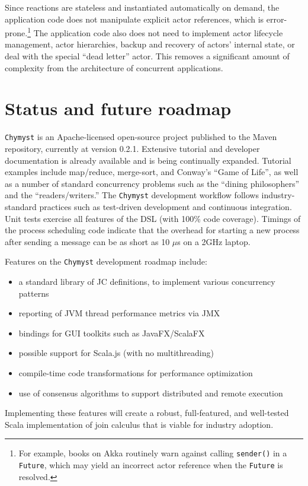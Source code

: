 \documentclass[sigplan,10pt,review,anonymous]{acmart}\settopmatter{printfolios=true}
\begin{document}
Since reactions are stateless and instantiated automatically
on demand, the application code does not manipulate explicit actor
references, which is error-prone.\footnote{ For example, books on Akka routinely warn against calling \texttt{sender()}
in a \texttt{Future}, which may yield an incorrect actor reference
when the \texttt{Future} is resolved.} The application code also does not need to implement actor lifecycle
management, actor hierarchies, backup and recovery of actors' internal
state, or deal with the special ``dead letter'' actor. This removes
a significant amount of complexity from the architecture of concurrent
applications.

\section{Status and future roadmap}

\texttt{Chymyst} is an Apache-licensed open-source project published
to the Maven repository, currently at version 0.2.1. Extensive tutorial
and developer documentation is already available and is being continually
expanded. Tutorial examples include map/reduce, merge-sort, and Conway's
``Game of Life'', as well as a number of standard concurrency problems
such as the ``dining philosophers'' and the ``readers/writers.''
The \texttt{Chymyst} development workflow follows industry-standard
practices such as test-driven development and continuous integration.
Unit tests exercise all features of the DSL (with 100\% code coverage).
Timings of the process scheduling code indicate that the overhead
for starting a new process after sending a message can be as short
as 10 $\mu$s on a 2GHz laptop. 

Features on the \texttt{Chymyst} development roadmap include:
\begin{itemize}
\item a standard library of JC definitions, to implement various concurrency
patterns
\item reporting of JVM thread performance metrics via JMX
\item bindings for GUI toolkits such as JavaFX/ScalaFX
\item possible support for Scala.js (with no multithreading)
\item compile-time code transformations for performance optimization
\item use of consensus algorithms to support distributed and remote execution
\end{itemize}
Implementing these features will create a robust, full-featured, and
well-tested Scala implementation of join calculus that is viable for
industry adoption.
\end{document}
